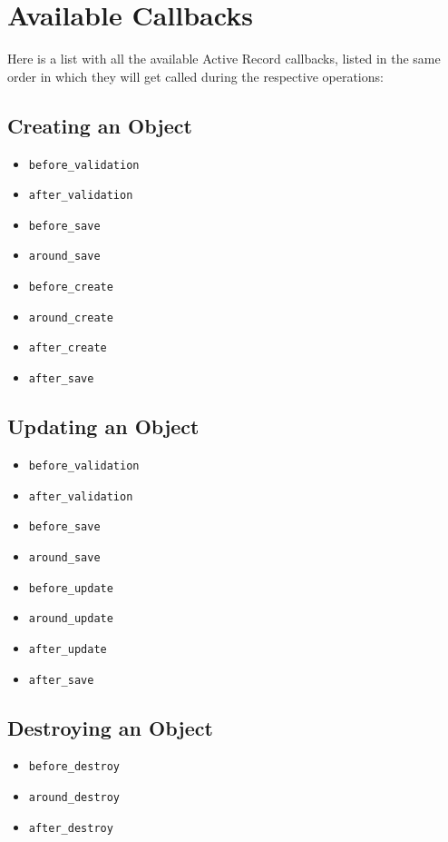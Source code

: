 \documentclass[10pt]{book}
\begin{document}
\section{ Available Callbacks}

Here is a list with all the available Active Record callbacks, listed  in the same order in which they will get called during the respective  operations:

\subsection{ Creating an Object}
\begin{itemize}
	\item \texttt{before\_validation}
	\item \texttt{after\_validation}
	\item \texttt{before\_save}
	\item \texttt{around\_save}
	\item \texttt{before\_create}
	\item \texttt{around\_create}
	\item \texttt{after\_create}
	\item \texttt{after\_save}
\end{itemize}

\subsection{ Updating an Object}
\begin{itemize}
	\item \texttt{before\_validation}
	\item \texttt{after\_validation}
	\item \texttt{before\_save}
	\item \texttt{around\_save}
	\item \texttt{before\_update}
	\item \texttt{around\_update}
	\item \texttt{after\_update}
	\item \texttt{after\_save}
\end{itemize}

\subsection{ Destroying an Object}
\begin{itemize}
	\item \texttt{before\_destroy}
	\item \texttt{around\_destroy}
	\item \texttt{after\_destroy}
\end{itemize}
\end{document}
